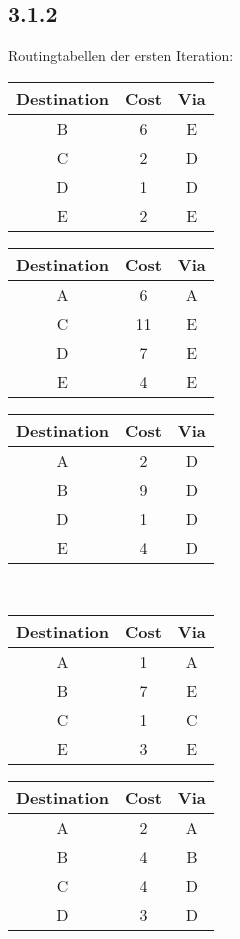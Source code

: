 \documentclass[a4paper,
			llpt,
			solution,
			accentcolor=tud2d,
			colorbacktitle
			]
			{tudexercise}
\newcommand{\8}{$\infty$}
\begin{document}
\subsection{3.1.2}
Routingtabellen der ersten Iteration:\\
\begin{multicols}{3}
\begin{tabular}{c|c|c}
Destination & Cost & Via \\ \hline
B           & 6    & E   \\
C           & 2    & D   \\
D           & 1    & D   \\
E           & 2    & E   \\
\end{tabular}
\vfill
\columnbreak
\begin{tabular}{c|c|c}
Destination & Cost & Via \\ \hline
A           & 6    & A   \\
C           & 11   & E   \\
D           & 7    & E   \\
E           & 4    & E   \\
\end{tabular}
\vfill
\columnbreak
\begin{tabular}{c|c|c}
Destination & Cost & Via \\ \hline
A           & 2    & D   \\
B           & 9    & D   \\
D           & 1    & D   \\
E           & 4    & D   \\
\end{tabular}
\end{multicols}
~\\[0.1ex]
\begin{multicols}{3}
\begin{tabular}{c|c|c}
Destination & Cost & Via \\ \hline
A           & 1    & A   \\
B           & 7    & E   \\
C           & 1    & C   \\
E           & 3    & E   \\
\end{tabular}
\vfill
\columnbreak
\begin{tabular}{c|c|c}
Destination & Cost & Via \\ \hline
A           & 2    & A   \\
B           & 4    & B   \\
C           & 4    & D   \\
D           & 3    & D   \\
\end{tabular}
\end{multicols}
\end{document}

